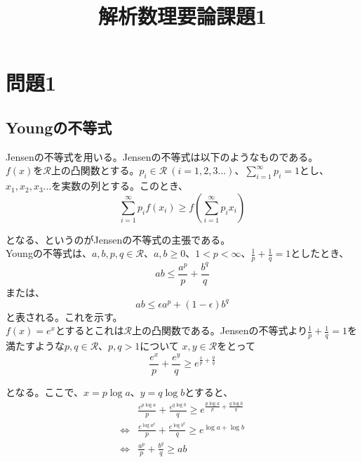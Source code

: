 \documentclass[a4paper,10pt]{jsarticle}
\title{解析数理要論課題1}
\author{}
\begin{document}
\maketitle

\section{問題1}
\subsection{Youngの不等式}
Jensenの不等式を用いる。Jensenの不等式は以下のようなものである。\\

$f(x)$を$\mathcal{R}$上の凸関数とする。$p_i\in \mathcal{R}~(i=1,2,3...)$、$\sum_{i=1}^\infty p_i=1$とし、
$x_1,x_2,x_3...$を実数の列とする。このとき、
\begin{equation}
 \sum_{i=1}^\infty p_if(x_i) \ge f\left(\sum_{i=1}^\infty p_ix_i\right)
\end{equation}

となる、というのがJensenの不等式の主張である。\\
Youngの不等式は、$a,b,p,q \in \mathcal{R}$、$a,b \ge 0$、$1 < p < \infty$、$\frac{1}{p}+\frac{1}{q}=1$としたとき、
\begin{equation}
 ab \le \frac{a^p}{p} + \frac{b^q}{q}
\end{equation}
または、
\begin{equation}
 ab \le \epsilon a^p + (1-\epsilon)b^q
\end{equation}
と表される。これを示す。\\

$f(x)=e^x$とするとこれは$\mathcal{R}$上の凸関数である。Jensenの不等式より$\frac{1}{p}+\frac{1}{q}=1$を満たすような$p,q \in \mathcal{R}$、$p,q > 1$について
$x, y \in \mathcal{R}$をとって
\begin{equation}
 \frac{e^x}{p}+\frac{e^y}{q}\ge e^{\frac{x}{p}+\frac{y}{q}}
\end{equation}

となる。ここで、$x=p\log a$、$y=q\log b$とすると、
\begin{align}
 &\frac{e^{p\log a}}{p}+\frac{e^{q\log b}}{q} \ge e^{\frac{p\log a}{p}+\frac{q\log b}{q}} \\
 \iff&\frac{e^{\log a^p}}{p}+\frac{e^{\log b^q}}{q} \ge e^{\log a + \log b} \\
 \iff&\frac{a^p}{p}+\frac{b^q}{q}\ge ab
\end{align}
\end{document}
